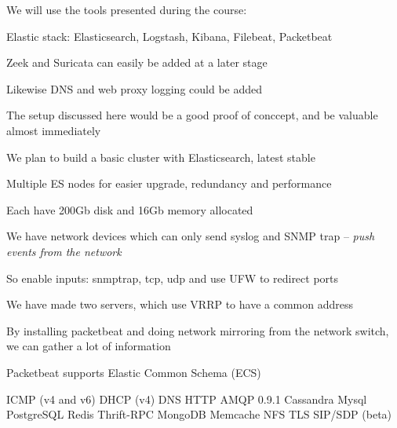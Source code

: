 \documentclass[Screen16to9,17pt]{foils}
\begin{document}
We will use the tools presented during the course:
\begin{list2}
\item Elastic stack: Elasticsearch, Logstash, Kibana, Filebeat, Packetbeat
\item Zeek and Suricata can easily be added at a later stage
\item Likewise DNS and web proxy logging could be added
\end{list2}

\vskip 1cm

The setup discussed here would be a good proof of conccept, and be valuable almost immediately




\begin{list2}
\item We plan to build a basic cluster with Elasticsearch, latest stable
\item Multiple ES nodes for easier upgrade, redundancy and performance
\item Each have 200Gb disk and 16Gb memory allocated
\end{list2}






\begin{list2}
\item We have network devices which can only send syslog and SNMP trap -- \emph{push events from the network}
\item So enable inputs: snmptrap, tcp, udp and use UFW to redirect ports
\item We have made two servers, which use VRRP to have a common address
\end{list2}




\begin{list2}
\item By installing packetbeat and doing network mirroring from the network switch, we can gather a lot of information
\item Packetbeat supports Elastic Common Schema (ECS) 
\item ICMP (v4 and v6)
DHCP (v4)
DNS
HTTP
AMQP 0.9.1
Cassandra
Mysql
PostgreSQL
Redis
Thrift-RPC
MongoDB
Memcache
NFS
TLS
SIP/SDP (beta)
\end{list2}
\end{document}

